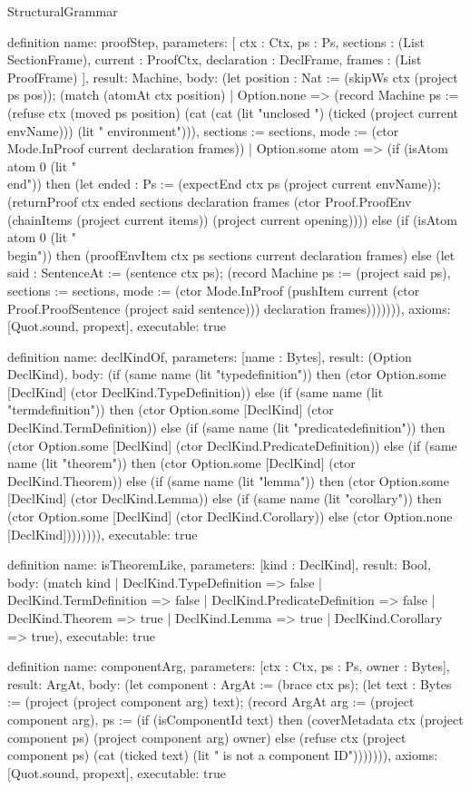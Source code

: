 \begin{lexlean}{StructuralGrammar}
\begin{semanticmodule}
{{definition{
  name: proofStep,
  parameters: [
    ctx : Ctx,
    ps : Ps,
    sections : (List SectionFrame),
    current : ProofCtx,
    declaration : DeclFrame,
    frames : (List ProofFrame)
  ],
  result: Machine,
  body: (let position : Nat := (skipWs ctx (project ps pos)); (match (atomAt ctx position)
    | Option.none => (record Machine {ps := (refuse ctx (moved ps position) (cat (cat (lit "unclosed ") (ticked (project current envName))) (lit " environment"))), sections := sections, mode := (ctor Mode.InProof current declaration frames)})
    | Option.some atom => (if (isAtom atom 0 (lit "\\end")) then (let ended : Ps := (expectEnd ctx ps (project current envName)); (returnProof ctx ended sections declaration frames (ctor Proof.ProofEnv (chainItems (project current items)) (project current opening)))) else (if (isAtom atom 0 (lit "\\begin")) then (proofEnvItem ctx ps sections current declaration frames) else (let said : SentenceAt := (sentence ctx ps); (record Machine {ps := (project said ps), sections := sections, mode := (ctor Mode.InProof (pushItem current (ctor Proof.ProofSentence (project said sentence))) declaration frames)})))))),
  axioms: [Quot.sound, propext],
  executable: true
}

definition{
  name: declKindOf,
  parameters: [name : Bytes],
  result: (Option DeclKind),
  body: (if (same name (lit "typedefinition")) then (ctor Option.some [DeclKind] (ctor DeclKind.TypeDefinition)) else (if (same name (lit "termdefinition")) then (ctor Option.some [DeclKind] (ctor DeclKind.TermDefinition)) else (if (same name (lit "predicatedefinition")) then (ctor Option.some [DeclKind] (ctor DeclKind.PredicateDefinition)) else (if (same name (lit "theorem")) then (ctor Option.some [DeclKind] (ctor DeclKind.Theorem)) else (if (same name (lit "lemma")) then (ctor Option.some [DeclKind] (ctor DeclKind.Lemma)) else (if (same name (lit "corollary")) then (ctor Option.some [DeclKind] (ctor DeclKind.Corollary)) else (ctor Option.none [DeclKind]))))))),
  executable: true
}

definition{
  name: isTheoremLike,
  parameters: [kind : DeclKind],
  result: Bool,
  body: (match kind
    | DeclKind.TypeDefinition => false
    | DeclKind.TermDefinition => false
    | DeclKind.PredicateDefinition => false
    | DeclKind.Theorem => true
    | DeclKind.Lemma => true
    | DeclKind.Corollary => true),
  executable: true
}

definition{
  name: componentArg,
  parameters: [ctx : Ctx, ps : Ps, owner : Bytes],
  result: ArgAt,
  body: (let component : ArgAt := (brace ctx ps); (let text : Bytes := (project (project component arg) text); (record ArgAt {arg := (project component arg), ps := (if (isComponentId text) then (coverMetadata ctx (project component ps) (project component arg) owner) else (refuse ctx (project component ps) (cat (ticked text) (lit " is not a component ID"))))}))),
  axioms: [Quot.sound, propext],
  executable: true
}

}}
\end{semanticmodule}
\end{lexlean}
